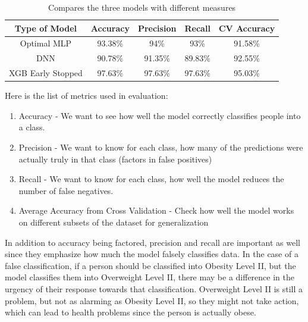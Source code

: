 \documentclass[11pt]{article}
\begin{document}
\begin{table}[h]
    \centering
    \begin{tabular}{|c|c|c|c|c|}
         \hline
         Type of Model & Accuracy & Precision & Recall & CV Accuracy\\
         \hline
         Optimal MLP & 93.38\% & 94\%  & 93\% & 91.58\%\\
         \hline
         DNN & 90.78\% & 91.35\% & 89.83\% & 92.55\%\\
         \hline
         XGB Early Stopped & 97.63\% & 97.63\% & 97.63\% & 95.03\%\\
         \hline
    \end{tabular}
    \caption{Compares the three models with different measures}
    \label{tab:my_label}
\end{table}
    Here is the list of metrics used in evaluation:
    \begin{enumerate}
        \item Accuracy - We want to see how well the model correctly classifies people into a class.
        \item Precision - We want to know for each class, how many of the predictions were actually truly in that class (factors in false positives)
        \item Recall - We want to know for each class, how well the model reduces the number of false negatives.
        \item Average Accuracy from Cross Validation - Check how well the model works on different subsets of the dataset for generalization
    \end{enumerate}
    
    In addition to accuracy being factored, precision and recall are important as well since they emphasize how much the model falsely classifies data. In the case of a false classification, if a person should be classified into Obesity Level II, but the model classifies them into Overweight Level II, there may be a difference in the urgency of their response towards that classification. Overweight Level II is still a problem, but not as alarming as Obesity Level II, so they might not take action, which can lead to health problems since the person is actually obese. 
\end{document}

